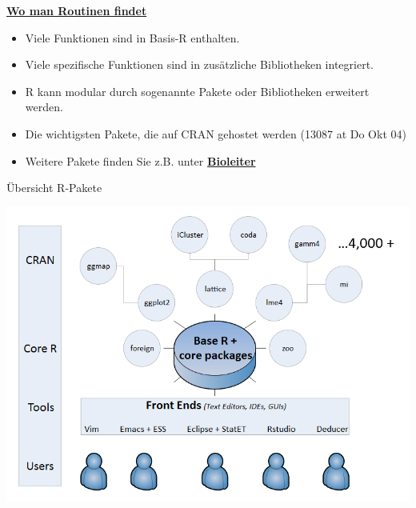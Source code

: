 \documentclass[ignorenonframetext,]{beamer}
\providecommand{\tightlist}{%
  \setlength{\itemsep}{0pt}\setlength{\parskip}{0pt}}
\begin{document}
\begin{frame}{\href{https://stats.idre.ucla.edu/r/seminars/intro/}{\textbf{Wo
man Routinen findet}}}

\begin{itemize}
\tightlist
\item
  Viele Funktionen sind in Basis-R enthalten.
\item
  Viele spezifische Funktionen sind in zusätzliche Bibliotheken
  integriert.
\item
  R kann modular durch sogenannte Pakete oder Bibliotheken erweitert
  werden.
\item
  Die wichtigsten Pakete, die auf CRAN gehostet werden (13087 at Do Okt
  04)
\item
  Weitere Pakete finden Sie z.B. unter
  \href{www.bioconductor.org}{\textbf{Bioleiter}}
\end{itemize}

\begin{block}{Übersicht R-Pakete}

\includegraphics{figure/Packages.PNG}

\end{block}

\end{frame}
\end{document}
